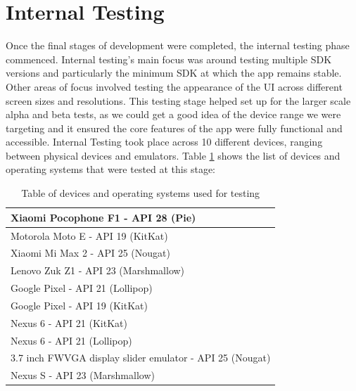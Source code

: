 \section{Internal Testing}
Once the final stages of development were completed, the internal testing phase commenced. Internal testing's main focus was around testing multiple SDK versions and particularly the minimum SDK at which the app remains stable. Other areas of focus involved testing the appearance of the UI across different screen sizes and resolutions. This testing stage helped set up for the larger scale alpha and beta tests, as we could get a good idea of the device range we were targeting and it ensured the core features of the app were fully functional and accessible. Internal Testing took place across 10 different devices, ranging between physical devices and emulators. Table \ref{devicetable} shows the list of devices and operating systems that were tested at this stage:
\begin{table}[ht]
\centering
\begin{tabular}{|l|}
\hline
Xiaomi Pocophone F1 - API 28 (Pie)                       \\ \hline
Motorola Moto E - API 19 (KitKat)                        \\ \hline
Xiaomi Mi Max 2 - API 25 (Nougat)                        \\ \hline
Lenovo Zuk Z1 - API 23 (Marshmallow)                     \\ \hline
Google Pixel - API 21 (Lollipop)                         \\ \hline
Google Pixel - API 19 (KitKat)                           \\ \hline
Nexus 6 - API 21 (KitKat)                                \\ \hline
Nexus 6 - API 21 (Lollipop)                              \\ \hline
3.7 inch FWVGA display slider emulator - API 25 (Nougat) \\ \hline
Nexus S - API 23 (Marshmallow)                           \\ \hline
\end{tabular}
\caption{Table of devices and operating systems used for testing}
\label{devicetable}
\end{table}
\par

